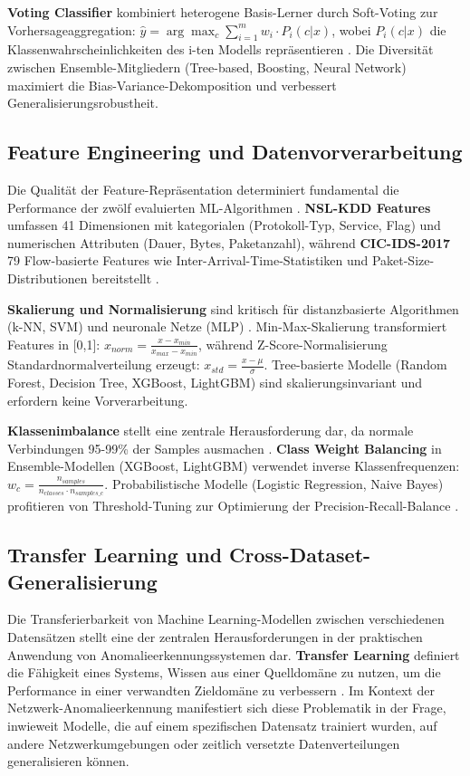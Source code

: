 \documentclass[11pt,a4paper]{article}
\begin{document}
    \textbf{Voting Classifier} kombiniert heterogene Basis-Lerner durch Soft-Voting zur Vorhersageaggregation: $\hat{y} = \arg\max_c \sum_{i=1}^{m} w_i \cdot P_i(c|x)$, wobei $P_i(c|x)$ die Klassenwahrscheinlichkeiten des i-ten Modells repräsentieren \parencite{Hastie2009}. Die Diversität zwischen Ensemble-Mitgliedern (Tree-based, Boosting, Neural Network) maximiert die Bias-Variance-Dekomposition und verbessert Generalisierungsrobustheit.

    \subsection{Feature Engineering und Datenvorverarbeitung}

    Die Qualität der Feature-Repräsentation determiniert fundamental die Performance der zwölf evaluierten ML-Algorithmen \parencite{Gharib2016}. \textbf{NSL-KDD Features} umfassen 41 Dimensionen mit kategorialen (Protokoll-Typ, Service, Flag) und numerischen Attributen (Dauer, Bytes, Paketanzahl), während \textbf{CIC-IDS-2017} 79 Flow-basierte Features wie Inter-Arrival-Time-Statistiken und Paket-Size-Distributionen bereitstellt \parencite{Sharafaldin2018}.

    \textbf{Skalierung und Normalisierung} sind kritisch für distanzbasierte Algorithmen (k-NN, SVM) und neuronale Netze (MLP) \parencite{Bishop2006}. Min-Max-Skalierung transformiert Features in [0,1]: $x_{norm} = \frac{x - x_{min}}{x_{max} - x_{min}}$, während Z-Score-Normalisierung Standardnormalverteilung erzeugt: $x_{std} = \frac{x - \mu}{\sigma}$. Tree-basierte Modelle (Random Forest, Decision Tree, XGBoost, LightGBM) sind skalierungsinvariant und erfordern keine Vorverarbeitung.

    \textbf{Klassenimbalance} stellt eine zentrale Herausforderung dar, da normale Verbindungen 95-99\% der Samples ausmachen \parencite{Ring2019}. \textbf{Class Weight Balancing} in Ensemble-Modellen (XGBoost, LightGBM) verwendet inverse Klassenfrequenzen: $w_c = \frac{n_{samples}}{n_{classes} \cdot n_{samples\_c}}$. Probabilistische Modelle (Logistic Regression, Naive Bayes) profitieren von Threshold-Tuning zur Optimierung der Precision-Recall-Balance \parencite{Hastie2009}.

    \subsection{Transfer Learning und Cross-Dataset-Generalisierung}

    Die Transferierbarkeit von Machine Learning-Modellen zwischen verschiedenen Datensätzen stellt eine der zentralen Herausforderungen in der praktischen Anwendung von Anomalieerkennungssystemen dar. \textbf{Transfer Learning} definiert die Fähigkeit eines Systems, Wissen aus einer Quelldomäne zu nutzen, um die Performance in einer verwandten Zieldomäne zu verbessern \parencite{Goodfellow2016}. Im Kontext der Netzwerk-Anomalieerkennung manifestiert sich diese Problematik in der Frage, inwieweit Modelle, die auf einem spezifischen Datensatz trainiert wurden, auf andere Netzwerkumgebungen oder zeitlich versetzte Datenverteilungen generalisieren können.
\end{document}
